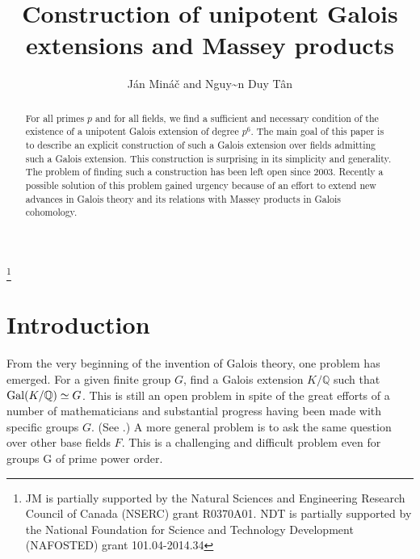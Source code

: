 \documentclass[12pt,leqno]{amsart}
\theoremstyle{plain}
\theoremstyle{definition}
\newcommand{\Q}{{\mathbb Q}}
\def\NDT{{\fontencoding{T5}\selectfont Nguy\~ \ecircumflex n Duy T\^an}}
\begin{document}
\title{Construction of unipotent Galois extensions and Massey products }
\begin{abstract} 
For all primes $p$ and for all fields, we find a sufficient and necessary condition of the existence of a unipotent Galois extension of degree $p^6$. The main goal of this paper is to describe an explicit construction of such a Galois extension over fields  admitting such a Galois extension.
This construction is surprising in its simplicity and generality.  
The problem of finding such a construction has been left open since 2003. Recently a possible solution of this problem gained urgency because of an effort to extend   new advances in Galois theory and its relations with Massey products in Galois cohomology.
\end{abstract} 
 \author{ J\'an Min\'a\v{c} and \NDT}
\address{Department of Mathematics, Western University, London, Ontario, Canada N6A 5B7}
\address{Department of Mathematics, Western University, London, Ontario, Canada N6A 5B7 and Institute of Mathematics, Vietnam Academy of Science and Technology, 18 Hoang Quoc Viet, 10307, Hanoi - Vietnam } 
\thanks{JM is partially supported  by the Natural Sciences and Engineering Research Council of Canada (NSERC) grant R0370A01. NDT is partially supported  by the National Foundation for Science and Technology Development (NAFOSTED) grant 101.04-2014.34}

\maketitle
\section{Introduction}
From the very beginning of the invention of Galois theory, one problem has emerged. For a given finite group $G$, find a Galois extension $K/\Q$ such that ${\rm Gal}(K/\Q)\simeq G$. This is still an open problem in  spite of the great efforts of a number of mathematicians and substantial progress having been made with specific groups $G$. (See \cite{Se3}.)
A more general problem is to ask the same question over other base fields $F$. This is a challenging and difficult problem even for groups G of prime power order.
\end{document}
